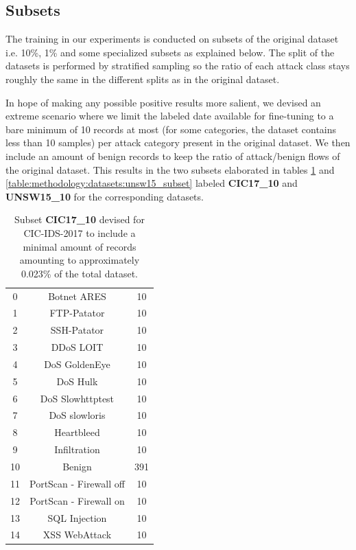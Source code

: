 \subsection{Subsets} \label{sec:methodology:subsets}

The training in our experiments is conducted on subsets of the original dataset i.e. 10\%, 1\% and some specialized subsets as explained below. The split of the datasets is performed by stratified sampling so the ratio of each attack class stays roughly the same in the different splits as in the original dataset.

In hope of making any possible positive results more salient, we devised an extreme scenario where we limit the labeled date available for fine-tuning to a bare minimum of 10 records at most (for some categories, the dataset contains less than 10 samples) per attack category present in the original dataset. We then include an amount of benign records to keep the ratio of attack/benign flows of the original dataset. This results in the two subsets elaborated in tables \ref{table:methodology:datasets:cic17_subset} and \ref{table:methodology:datasets:unsw15_subset} labeled \textbf{CIC17\_10} and \textbf{UNSW15\_10} for the corresponding datasets.

\begin{table}[H]
	\centering
	\begin{tabular}{ccc}
		\thead{\textbf{\#}} & \thead{\textbf{Class}} & \thead{\textbf{No. Records}} \\ \hline \midrule
		0  & Botnet ARES             & 10  \\
		1  & FTP-Patator             & 10  \\
		2  & SSH-Patator             & 10  \\
		3  & DDoS LOIT               & 10  \\
		4  & DoS GoldenEye           & 10  \\
		5  & DoS Hulk                & 10  \\
		6  & DoS Slowhttptest        & 10  \\
		7  & DoS slowloris           & 10  \\
		8  & Heartbleed              & 10  \\
		9  & Infiltration            & 10  \\
		10 & Benign                  & 391 \\
		11 & PortScan - Firewall off & 10  \\
		12 & PortScan - Firewall on  & 10  \\
		13 & SQL Injection           & 10  \\
		14 & XSS WebAttack           & 10                    
	\end{tabular}
	\caption{Subset \textbf{CIC17\_10} devised for CIC-IDS-2017 to include a minimal amount of records amounting to approximately 0.023\% of the total dataset.}
	\label{table:methodology:datasets:cic17_subset}
\end{table}

